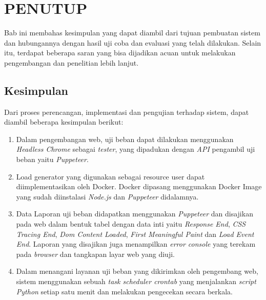 \chapter{PENUTUP}
    Bab ini membahas kesimpulan yang dapat diambil dari tujuan pembuatan sistem dan hubungannya dengan hasil uji coba dan evaluasi yang telah dilakukan. Selain itu, terdapat beberapa saran yang bisa dijadikan acuan untuk melakukan pengembangan dan penelitian lebih lanjut.
        
	\section{Kesimpulan}
        Dari proses perencangan, implementasi dan pengujian terhadap sistem, dapat diambil beberapa kesimpulan berikut:
        \begin{enumerate}
        	\item Dalam pengembangan web, uji beban dapat dilakukan menggunakan \textit{Headless Chrome} sebagai \textit{tester}, yang dipadukan dengan \textit{API} pengambil uji beban yaitu \textit{Puppeteer}.
     		\item Load generator yang digunakan sebagai resource user dapat diimplementasikan oleh Docker. Docker dipasang menggunakan Docker Image yang sudah diinstalasi \textit{Node.js} dan \textit{Puppeteer} didalamnya.
        	\item Data Laporan uji beban didapatkan menggunakan \textit{Puppeteer} dan disajikan pada web dalam bentuk tabel dengan data inti yaitu \textit{Response End}, \textit{CSS Tracing End}, \textit{Dom Content Loaded}, \textit{First Meaningful Paint} dan \textit{Load Event End}. Laporan yang disajikan juga menampilkan \textit{error console} yang terekam pada \textit{browser} dan tangkapan layar web yang diuji.
        	\item Dalam menangani layanan uji beban yang dikirimkan oleh pengembang web, sistem menggunakan sebuah \textit{task scheduler crontab} yang menjalankan \textit{script Python} setiap satu menit dan melakukan pengecekan secara berkala.
        \end{enumerate}
        
